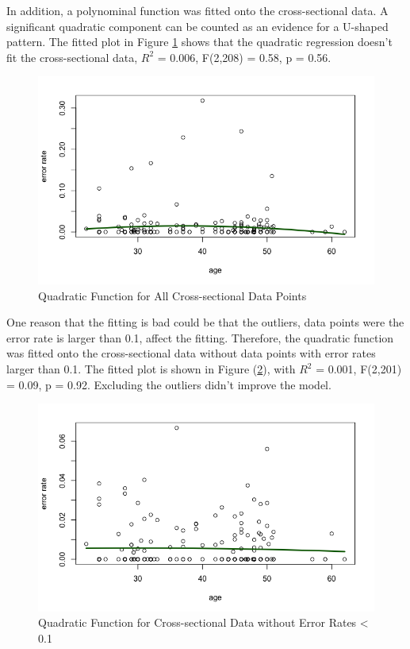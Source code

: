 In addition, a polynominal function was fitted onto the cross-sectional data. A significant quadratic component can be counted as an evidence for a U-shaped pattern. The fitted plot in Figure \ref{poly1} shows that the quadratic regression doesn't fit the cross-sectional data, $R^2$ = 0.006, F(2,208) = 0.58, p = 0.56.
\vspace{-1em}
\FloatBarrier
\begin{figure}[h]
    \centering
    \includegraphics[scale = 0.5]{graph/polynominal1.png}
    \vspace{-1em}
    \caption{Quadratic Function for All Cross-sectional Data Points}
    \label{poly1}
\end{figure}
\FloatBarrier
One reason that the fitting is bad could be that the outliers, data points were the error rate is larger than 0.1, affect the fitting. Therefore, the quadratic function was fitted onto the cross-sectional data without data points with error rates larger than 0.1. The fitted plot is shown in Figure (\ref{poly2}), with $R^2$ = 0.001, F(2,201) = 0.09, p = 0.92. Excluding the outliers didn't improve the model.
\FloatBarrier
\begin{figure}[h]
    \centering
    \includegraphics[scale = 0.5]{graph/polynominal2.png}
        \vspace{-1em}
    \caption{Quadratic Function for Cross-sectional Data without Error Rates < 0.1}
    \label{poly2}
\end{figure}
